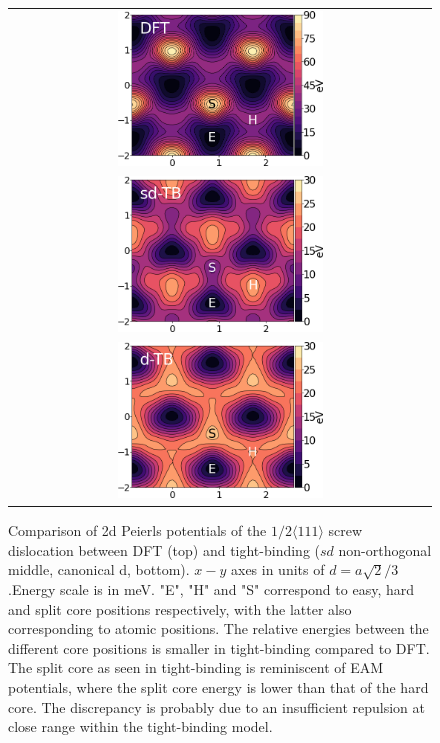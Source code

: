 \documentclass[a4paper,11pt]{article}
\begin{document}
        \begin{figure}
\centering
    \begin{tabular}{c}
	     \includegraphics[width=0.5\textwidth]{Images/peierls_potential_dft_labelled_zeal.png} \\
             \includegraphics[width=0.5\textwidth]{Images/peierls_potential_sdTB_labelled_zeal.png}  \\
             \includegraphics[width=0.5\textwidth]{Images/peierls_potential_dTB_labelled_zeal.png}  \\
    \end{tabular}
\caption{Comparison of 2d Peierls potentials of the $1/2\langle 111\rangle$ screw dislocation between DFT \cite{Itakura2012} (top) and tight-binding ($sd$ non-orthogonal middle, canonical d, bottom). $x-y$ axes in units of $d=a\sqrt{2} / 3$.Energy scale is in meV. "E", "H" and "S" correspond to easy, hard and split core positions respectively, with the latter also corresponding to atomic positions. The relative energies between the different core positions is smaller in tight-binding compared to DFT. The split core as seen in tight-binding is reminiscent of EAM potentials, where the split core energy is lower than that of the hard core. The discrepancy is probably due to an insufficient repulsion at close range within the tight-binding model.}
	\label{fig:peierlspot}
    \end{figure}
\end{document}
